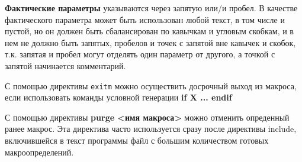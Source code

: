 \textbf{Фактические параметры} указываются через запятую или/и пробел. В качестве фактического параметра может быть использован любой текст, в том числе и пустой, но он должен быть сбалансирован по кавычкам и угловым скобкам, и в нем не должно быть запятых, пробелов и точек с запятой вне кавычек и скобок, т.к. запятая и пробел могут отделять один параметр от другого, а точкой с запятой начинается комментарий.

С помощью директивы \verb|exitm| можно осуществить досрочный выход из макроса, если использовать команды условной генерации \textbf{if X ... endif}

С помощью директивы \textbf{purge <имя макроса>} можно отменить опреденный ранее макрос. Эта директива часто используется сразу после директивы include, включившейся в текст программы файл с большим количеством готовых макроопределений.

